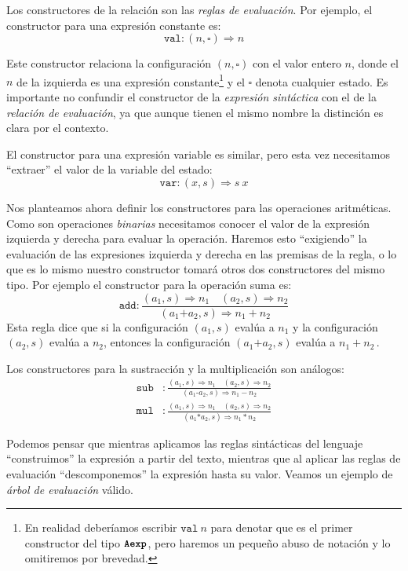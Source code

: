 \documentclass[
  a4paper, 
  10pt, 
  parskip=half, 
  toc=bibliography,
]{scrbook}
\theoremstyle{definition}
\theoremstyle{bolddef}
\newcommand{\funfont}[1]{\texttt{#1}}
\newcommand{\tyfont}[1]{\texttt{\textbf{#1}}}
\newcommand{\placeholder}{\square}
\newcommand{\ImpPlus}{\mathbin{\texttt{+}}}
\newcommand{\ImpMinus}{\mathbin{\texttt{-}}}
\newcommand{\ImpTimes}{\mathbin{\texttt{*}}}
\newcommand{\bigstep}{\Longrightarrow}
\begin{document}
Los constructores de la relación son las \emph{reglas de evaluación}. Por ejemplo, el
constructor para una expresión constante es:
\[
  \funfont{val} : (n, \placeholder) \bigstep n
\]

Este constructor relaciona la configuración \((n, \placeholder)\) con el valor entero \(n\), 
donde el \(n\) de la izquierda es una expresión 
constante\footnote{En realidad deberíamos escribir \(\funfont{val} \ n\)
  para denotar que es el primer constructor del tipo \(\tyfont{Aexp}\), pero
  haremos un pequeño abuso de notación y lo omitiremos por brevedad.} y el 
\(\placeholder\) denota cualquier estado. Es importante no confundir el constructor
de la \emph{expresión sintáctica} con el de la \emph{relación de evaluación}, ya 
que aunque tienen el mismo nombre la distinción es clara por el contexto.

El constructor para una expresión variable es similar, pero esta vez necesitamos
\enquote{extraer} el valor de la variable del estado:
\[
  \funfont{var} : (x, s) \bigstep s \ x
\]

Nos planteamos ahora definir los constructores para las operaciones
aritméticas. Como son operaciones \emph{binarias} necesitamos conocer
el valor de la expresión izquierda y derecha para evaluar la operación.
Haremos esto \enquote{exigiendo} la evaluación de las expresiones izquierda y derecha en 
las premisas de la regla, o lo que es lo mismo nuestro constructor 
tomará otros dos constructores del mismo tipo. Por ejemplo el
constructor para la operación suma es:
\[
  \funfont{add} : \frac{(a_1, s) \bigstep n_1 \quad (a_2, s) \bigstep n_2}
   {(a_1 \ImpPlus a_2, s) \bigstep n_1 + n_2}
\]
Esta regla dice que si la configuración \((a_1, s)\) evalúa a \(n_1\) y la
configuración \((a_2, s)\) evalúa a \(n_2\), entonces la configuración
\((a_1 \ImpPlus a_2, s)\) evalúa a \(n_1 + n_2\, \).

Los constructores para la sustracción y la multiplicación son análogos:
\begin{align*}
  \funfont{sub} &: \frac{(a_1, s) \bigstep n_1 \quad (a_2, s) \bigstep n_2}
   {(a_1 \ImpMinus a_2, s) \bigstep n_1 - n_2} \\
  \funfont{mul} &: \frac{(a_1, s) \bigstep n_1 \quad (a_2, s) \bigstep n_2}
   {(a_1 \ImpTimes a_2, s) \bigstep n_1 * n_2}
\end{align*}

Podemos pensar que mientras aplicamos las reglas sintácticas del lenguaje
\enquote{construimos} la expresión a partir del texto, mientras que al aplicar 
las reglas de evaluación \enquote{descomponemos} la expresión hasta su valor.
Veamos un ejemplo de \emph{árbol de evaluación} válido.
\end{document}

